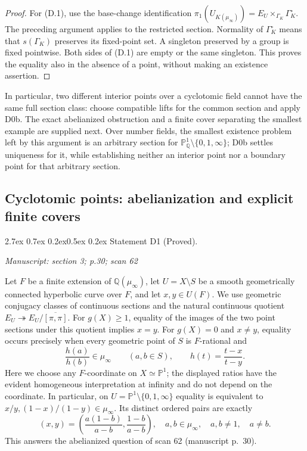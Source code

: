\documentclass[11pt,a4paper]{article}
\makeatletter
\newcommand{\passage}[1]{\par\smallskip\noindent\textit{Manuscript: #1}\par\smallskip}
\renewcommand\paragraph{\@startsection{paragraph}{4}{\z@}%
  {2.7ex \@plus 0.7ex \@minus 0.2ex}{0.5ex \@plus 0.2ex}%
  {\normalfont\normalsize\bfseries}}
\makeatother
\begin{document}
\begin{proof}
For (D.1), use the base-change identification $\pi_1(U_{K(\mu_\infty)})=E_U\times_{\Gamma_K}\Gamma_K^\circ$. The preceding argument applies to the restricted section. Normality of $\Gamma_K^\circ$ means that $s(\Gamma_K)$ preserves its fixed-point set. A singleton preserved by a group is fixed pointwise. Both sides of (D.1) are empty or the same singleton. This proves the equality also in the absence of a point, without making an existence assertion.
\end{proof}

In particular, two different interior points over a cyclotomic field cannot have the same full section class: choose compatible lifts for the common section and apply D0b. The exact abelianized obstruction and a finite cover separating the smallest example are supplied next. Over number fields, the smallest existence problem left by this argument is an arbitrary section for $\mathbb P^1_{\mathbb Q}\setminus\{0,1,\infty\}$; D0b settles uniqueness for it, while establishing neither an interior point nor a boundary point for that arbitrary section.



\subsection{Cyclotomic points: abelianization and explicit finite covers}

\paragraph{Statement D1 (Proved).}\label{res:D1}
\passage{section 3; p.30; scan 62}

Let $F$ be a finite extension of $\mathbb Q(\mu_\infty)$, let
$U=X\setminus S$ be a smooth geometrically connected hyperbolic curve over
$F$, and let $x,y\in U(F)$.  We use geometric conjugacy classes of continuous
sections and the natural continuous quotient
$E_U\twoheadrightarrow E_U/\overline{[\pi,\pi]}$.
For $g(X)\geq1$, equality of the images of the two point sections under this
quotient implies $x=y$.  For $g(X)=0$ and $x\ne y$, equality occurs precisely
when every geometric point of $S$ is $F$-rational and
\[
 \frac{h(a)}{h(b)}\in\mu_\infty\qquad(a,b\in S),\qquad
 h(t)=\frac{t-x}{t-y}.
\]
Here we choose any $F$-coordinate on $X\simeq\mathbb P^1$; the displayed
ratios have the evident homogeneous interpretation at infinity and do not
depend on the coordinate.  In particular, on
$U=\mathbb P^1\setminus\{0,1,\infty\}$ equality is equivalent to
$x/y,(1-x)/(1-y)\in\mu_\infty$.  Its distinct ordered pairs are exactly
\[
 (x,y)=\left(\frac{a(1-b)}{a-b},\frac{1-b}{a-b}\right),\quad
 a,b\in\mu_\infty,\quad a,b\ne1,\quad a\ne b.
\]
This answers the abelianized question of scan 62 (manuscript p.~30).
\end{document}
